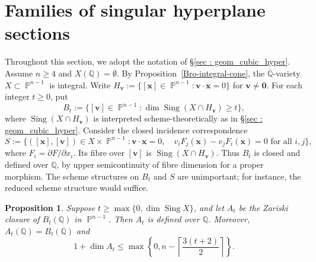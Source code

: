 \documentclass[a4paper,11pt, twoside,reqno]{amsart}
\theoremstyle{plain}
\newtheorem{prop}[thm]{Proposition}
\theoremstyle{definition}
\theoremstyle{remark}
\newcommand{\bfv}{\bm{v}}
\newcommand{\bfx}{\bm{x}}
\newcommand{\QQ}{\mathbb{Q}}
\DeclareMathOperator{\sing}{Sing}
\DeclareMathOperator{\PP}{\mathbb{P}}
\renewcommand{\le}{\leqslant}
\renewcommand{\ge}{\geqslant}
\newcommand{\Qbar}{\overline{\mathbb{Q}}}
\numberwithin{equation}{section}
\begin{document}
\section{Families of singular hyperplane sections}
\label{sec:dual-tangential-geometry}

Throughout this section, we adopt the notation of \S\ref{sec : geom_cubic_hyper}.
Assume $n\ge 4$ and $X(\QQ) = \emptyset$.
By Proposition~\ref{Bro-integral-cone},
the $\Qbar$-variety $X \subset \PP^{n-1}$ is integral.
Write $H_{\bfv} := \{[\bfx]\in \PP^{n-1}: \bfv\cdot \bfx=0\}$ for $\bfv\ne \bm0$.
For each integer $t\ge 0$, put
\begin{equation}
\label{EQ:general-bad-hyperplanes}
B_t:=
\{[\bfv]\in\PP^{n-1}:
\dim\sing(X\cap H_{\bfv})\ge t\},
\end{equation}
where $\sing(X\cap H_{\bfv})$ is interpreted scheme-theoretically
as in \S\ref{sec : geom_cubic_hyper}.
Consider the closed incidence correspondence
\begin{equation}
\label{EQ:universal-section-singular}
S:=\{([\bfx],[\bfv])\in X\times\PP^{n-1}:
 \bfv\cdot\bfx=0,\quad
 v_iF_j(\bfx)-v_jF_i(\bfx)=0\text{ for all }i,j\},
\end{equation}
where $F_i=\partial F/\partial x_i$.
Its fibre over $[\bfv]$ is $\sing(X\cap H_{\bfv})$.
Thus $B_t$ is closed and defined over $\QQ$,
by upper semicontinuity of fibre dimension for a proper morphism.
The scheme structures on $B_t$ and $S$
are unimportant; for instance, the reduced scheme structure would suffice.

\begin{prop}
\label{PROP:rational-exceptional-hyperplanes-general}
Suppose $t\ge\max\{0,\dim\sing X\}$,
and let $A_t$ be the Zariski closure of $B_t(\QQ)$ in $\PP^{n-1}$.
Then $A_t$ is defined over $\QQ$.
Moreover, $A_t(\QQ)=B_t(\QQ)$ and
\begin{equation}
\label{EQ:rational-terminal-bound}
1+\dim A_t\le
\max\left\{0,n-\left\lceil\frac{3(t+2)}2\right\rceil\right\}.
\end{equation}
\end{prop}
\end{document}
